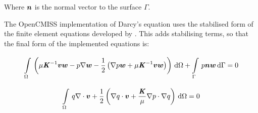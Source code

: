 Where $ \boldsymbol{n} $ is the normal vector to the surface $\Gamma$.

The OpenCMISS implementation of Darcy's equation uses the stabilised form of the finite element
equations developed by \citet{masud:2002}. This adds stabilising terms, so that the final form
of the implemented equations is:

\begin{equation}
  \gint{\Omega}{}{\pbrac{\mu \inverse{\tensor{K}} \vectr{v} \vectr{w} - p \gradient{}{\vectr{w}} - %
  \frac{1}{2} \pbrac{\gradient{}{p} \vectr{w} + \mu \inverse{\tensor{K}} \vectr{v} \vectr{w}}}}{\Omega} + %
  \gint{\Gamma}{}{p \vectr{n} \vectr{w}}{\Gamma}= 0
\end{equation}

\begin{equation}
  \gint{\Omega}{}{q \divergence{}{\vectr{v}} + %
  \frac{1}{2} \pbrac{\dotprod{\gradient{}{q}}{\vectr{v}} + %
  \frac{\tensor{K}}{\mu} \dotprod{\gradient{}{p}}{\gradient{}{q}}}}{\Omega}= 0
\end{equation}
